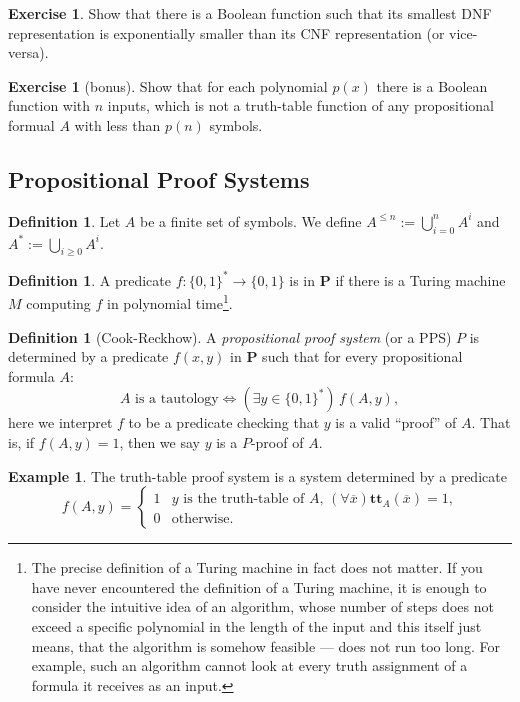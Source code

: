 \documentclass{article}
\theoremstyle{definition}
\newtheorem{excs}[thrm]{Exercise}
\newtheorem{exmp}[thrm]{Example}
\newtheorem{defi}[thrm]{Definition}
\renewcommand{\P}{\textbf{P}}
\begin{document}
\begin{excs}
    Show that there is a Boolean function such that its smallest DNF representation is exponentially smaller than its CNF representation (or vice-versa).
\end{excs}


\begin{excs}[bonus] 
    Show that for each polynomial $p(x)$ there is a Boolean function with $n$ inputs, which is not a truth-table function of any propositional formual $A$ with less than $p(n)$ symbols.
\end{excs}

\subsection*{Propositional Proof Systems}

\begin{defi}
    Let $A$ be a finite set of symbols. We define $A^{\leq n}:= \bigcup_{i=0}^n A^i$ and $A^* := \bigcup_{i\geq 0} A^i$.
\end{defi}

\begin{defi}
    A predicate $f:\{0,1\}^* \to \{0,1\}$ is in $\P$ if there is a Turing machine $M$ computing $f$ in polynomial time\footnote{The precise definition of a Turing machine in fact does not matter. If you have never encountered the definition of a Turing machine, it is enough to consider the intuitive idea of an algorithm, whose number of steps does not exceed a specific polynomial in the length of the input and this itself just means, that the algorithm is somehow feasible --- does not run too long. For example, such an algorithm cannot look at every truth assignment of a formula it receives as an input.}.
\end{defi}

\begin{defi}[Cook-Reckhow] A \emph{propositional proof system} (or a PPS) $P$ is determined by a predicate $f(x,y)$ in $\P$ such that for every propositional formula $A$:
    \[\text{$A$ is a tautology} \iff (\exists y\in \{0,1\}^*) \, f(A,y),\]
    here we interpret $f$ to be a predicate checking that $y$ is a valid ``proof'' of $A$. That is, if $f(A,y)=1$, then we say $y$ is a $P$-proof of $A$.
\end{defi}

\begin{exmp}
    The truth-table proof system is a system determined by a predicate     
    \[f(A,y)=\begin{cases}
        1 & \text{$y$ is the truth-table of $A$, $(\forall \overline x) \textbf{tt}_A(\overline x)=1$,}\\
        0 & \text{otherwise.}
    \end{cases}\]
\end{exmp}
\end{document}
